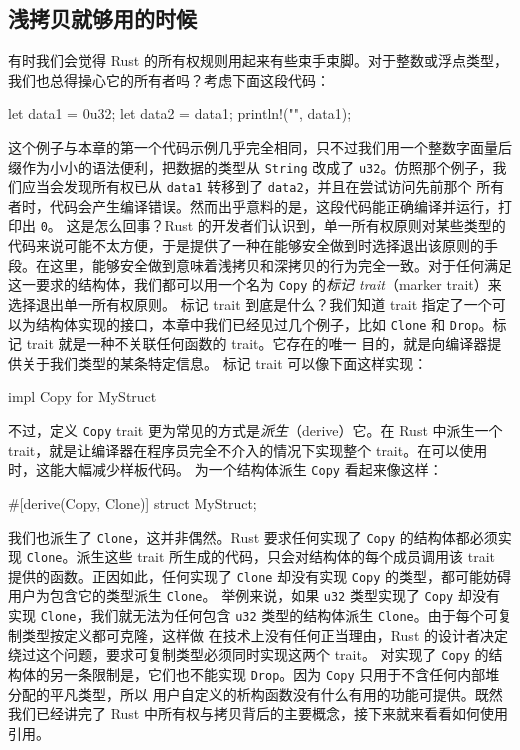 \subsection{浅拷贝就够用的时候}
\label{idx:idx_d7767ad9}
有时我们会觉得 Rust 的所有权规则用起来有些束手束脚。对于整数或浮点类型，我们也总得操心它的所有者吗？考虑下面这段代码：
\begin{codebox}[rust]
let data1 = 0u32;
let data2 = data1;
println!("{}", data1);
\end{codebox}
这个例子与本章的第一个代码示例几乎完全相同，只不过我们用一个整数字面量后缀作为小小的语法便利，把数据的类型从
\texttt{String} 改成了 \texttt{u32}。仿照那个例子，我们应当会发现所有权已从 \texttt{data1} 转移到了 \texttt{data2}，并且在尝试访问先前那个
所有者时，代码会产生编译错误。然而出乎意料的是，这段代码能正确编译并运行，打印出 \texttt{0}。
这是怎么回事？Rust 的开发者们认识到，单一所有权原则对某些类型的代码来说可能不太方便，于是提供了一种在能够安全做到时选择退出该原则的手段。在这里，能够安全做到意味着浅拷贝和深拷贝的行为完全一致。对于任何满足这一要求的结构体，我们都可以用一个名为 \texttt{Copy} 的\emph{标记 trait}（marker trait）来选择退出单一所有权原则。
标记 trait 到底是什么？我们知道 trait 指定了一个可以为结构体实现的接口，本章中我们已经见过几个例子，比如
\texttt{Clone} 和 \texttt{Drop}。标记 trait 就是一种不关联任何函数的 trait。它存在的唯一
目的，就是向编译器提供关于我们类型的某条特定信息。
标记 trait 可以像下面这样实现：
\begin{codebox}[rust]
impl Copy for MyStruct {}
\end{codebox}
不过，定义 \texttt{Copy} trait 更为常见的方式是\emph{派生}（derive）它。在 Rust 中派生一个 trait，就是让编译器在程序员完全不介入的情况下实现整个 trait。在可以使用时，这能大幅减少样板代码。
为一个结构体派生 \texttt{Copy} 看起来像这样：
\begin{codebox}[rust]
#[derive(Copy, Clone)]
struct MyStruct;
\end{codebox}
我们也派生了 \texttt{Clone}，这并非偶然。Rust 要求任何实现了 \texttt{Copy} 的结构体都必须实现 \texttt{Clone}。派生这些 trait 所生成的代码，只会对结构体的每个成员调用该 trait 提供的函数。正因如此，任何实现了 \texttt{Clone} 却没有实现 \texttt{Copy} 的类型，都可能妨碍用户为包含它的类型派生 \texttt{Clone}。
举例来说，如果 \texttt{u32} 类型实现了 \texttt{Copy} 却没有实现 \texttt{Clone}，我们就无法为任何包含
\texttt{u32} 类型的结构体派生 \texttt{Clone}。由于每个可复制类型按定义都可克隆，这样做
\label{idx:idx_231d7e61}
在技术上没有任何正当理由，Rust 的设计者决定绕过这个问题，要求可复制类型必须同时实现这两个 trait。
对实现了 \texttt{Copy} 的结构体的另一条限制是，它们也不能实现
\texttt{Drop}。因为 \texttt{Copy} 只用于不含任何内部堆分配的平凡类型，所以
用户自定义的析构函数没有什么有用的功能可提供。既然我们已经讲完了 Rust 中所有权与拷贝背后的主要概念，接下来就来看看如何使用引用。
